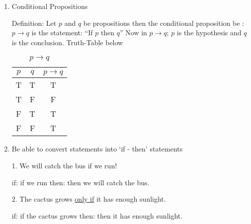 \documentclass[10pt,letterpaper]{article}
\begin{document}
{\begin{enumerate}
\end{enumerate}
}

\newpage
{
\begin{enumerate}
    \item []
     \begin{center}
     Conditional Propositions
     \end{center}
    
    Definition: Let $p$ and $q$ be propositions then the conditional proposition be : $p \rightarrow q$
    is the statement: ``If $p$ then $q$'' Now in $p \rightarrow q$; $p$ is the hypothesis and $q$ is the conclusion. Truth-Table below
    \begin{center} 
    \begin{table}[h!]
    \caption*{$p \rightarrow q$ }
        \centering
    \label{c}
    \begin{tabular}{|c c | c|} %
      \hline
      $p$ & $q$ &   $p \rightarrow q$  \\
      \hline
      T & T & T \\
      T & F & F \\
      F & T & T \\
      F & F & T \\
      \hline
    
        \end{tabular}
    \end{table}
\end{center}
    
    \item[] Be able to convert statements into `if - then' statements
    
    1. We will catch the bus if we run!
    
    \qquad if: if we run \quad then: then we will catch the bus.
    
    2. The cactus grows \underline{only if} it has enough sunlight.
    
    \qquad if: if the cactus grows \quad then: then it has enough sunlight.
    
    
    
\end{enumerate}
}
\end{document}
